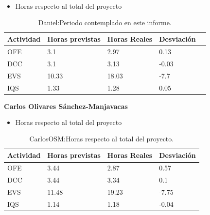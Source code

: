 \begin{itemize}
\item Horas respecto al total del proyecto
\end{itemize}
\begin{table}[H]
\begin{center}
\begin{tabular}{ l l l l l }
  Actividad & Horas previstas & Horas Reales & Desviación \\ \hline \hline
  	OFE & 3.1 & 2.97 & 0.13 \\ \hline
  	DCC & 3.1 & 3.13 & -0.03 \\ \hline
  	EVS & 10.33 & 18.03 & -7.7 \\ \hline
  	IQS & 1.33 & 1.28 & 0.05 \\ \hline
\end{tabular}
\caption{Daniel:Periodo contemplado en este informe.}
\label{tab:Daniel:PeriodoContempladoInforme}
\end{center}
\end{table}

\newpage

\textbf{Carlos Olivares Sánchez-Manjavacas}
\begin{itemize}
\item Horas respecto al total del proyecto
\end{itemize}
\begin{table}[H]
\begin{center}
\begin{tabular}{ l l l l }
  Actividad & Horas previstas & Horas Reales & Desviación \\ \hline \hline
    OFE & 3.44 & 2.87 & 0.57 \\ \hline
    DCC & 3.44 & 3.34 & 0.1 \\ \hline
    EVS & 11.48 & 19.23 & -7.75 \\ \hline
    IQS & 1.14 & 1.18 & -0.04 \\ \hline
\end{tabular}
\caption{CarlosOSM:Horas respecto al total del proyecto.}
\label{tab:CarlosOSM:HorasTotalInforme}
\end{center}
\end{table}

